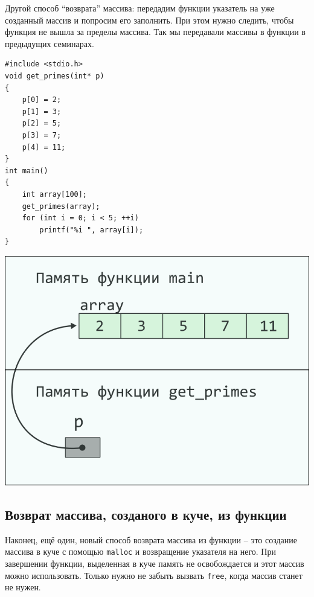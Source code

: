 \documentclass{article}
\begin{document}
Другой способ ``возврата'' массива: передадим функции указатель на
уже созданный массив и попросим его заполнить.
При этом нужно следить, чтобы функция не вышла за пределы массива.
Так мы передавали массивы в функции в предыдущих семинарах.


\noindent\begin{minipage}{.45\textwidth}
\begin{lstlisting}
#include <stdio.h>
void get_primes(int* p) 
{
    p[0] = 2;
    p[1] = 3;
    p[2] = 5;
    p[3] = 7;
    p[4] = 11;	
}
int main() 
{
    int array[100];
    get_primes(array);
    for (int i = 0; i < 5; ++i)
        printf("%i ", array[i]);
}
\end{lstlisting}
\end{minipage}
\begin{minipage}{.45\textwidth}
\includegraphics[scale=0.9]{../images/pointer_schemes/function_return_arg_array.png}
\end{minipage}
\newpage
\subsection*{Возврат массива, созданого в куче, из функции}

Наконец, ещё один, новый способ возврата массива из функции -- это создание
массива в куче с помощью \texttt{malloc} и возвращение указателя на него.
При завершении функции, выделенная в куче память не освобождается и этот массив
можно использовать. Только нужно не забыть вызвать \texttt{free}, когда 
массив станет не нужен.
\end{document}
